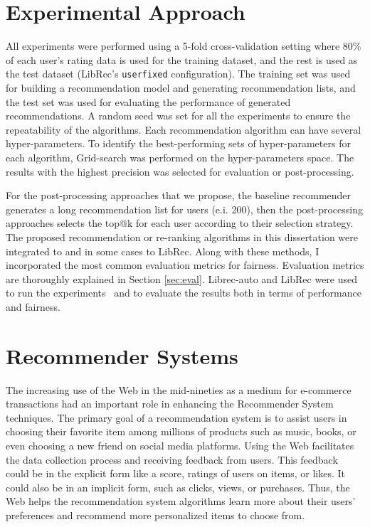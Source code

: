 \section{Experimental Approach}

    All experiments were performed using a 5-fold cross-validation setting where 80\% of each user's rating data is used for the training dataset, and the rest is used as the test dataset (LibRec's \texttt{userfixed} configuration). The training set was used for building a recommendation model and generating recommendation lists, and the test set was used for evaluating the performance of generated recommendations. A random seed was set for all the experiments to ensure the repeatability of the algorithms. Each recommendation algorithm can have several hyper-parameters. To identify the best-performing sets of hyper-parameters for each algorithm, Grid-search was performed on the hyper-parameters space. The results with the highest precision was selected for evaluation or post-processing.
    
    For the post-processing approaches that we propose, the baseline recommender generates a long recommendation list for users (e.i. 200), then the post-processing approaches selects the top@k for each user according to their selection strategy. The proposed recommendation or re-ranking algorithms in this dissertation were integrated to \libauto{} and in some cases to LibRec. Along with these methods, I incorporated the most common evaluation metrics for fairness. Evaluation metrics are thoroughly explained in Section \ref{sec:eval}. Librec-auto and LibRec were used to run the experiments~\cite{burke2020facct_libauto,Sonboli2020FARLA,guo2015librec,mansoury2019algorithm,mansoury2018automating} and to evaluate the results both in terms of performance and fairness.


\section{Recommender Systems}  
\label{sec:recsyssec}
    
    The increasing use of the Web in the mid-nineties as a medium for e-commerce transactions had an important role in enhancing the Recommender System techniques. The primary goal of a recommendation system is to assist users in choosing their favorite item among millions of products such as music, books, or even choosing a new friend on social media platforms. Using the Web facilitates the data collection process and receiving feedback from users. This feedback could be in the explicit form like a score, ratings of users on items, or likes. It could also be in an implicit form, such as clicks, views, or purchases. Thus, the Web helps the recommendation system algorithms learn more about their users’ preferences and recommend more personalized items to choose from. 
    
